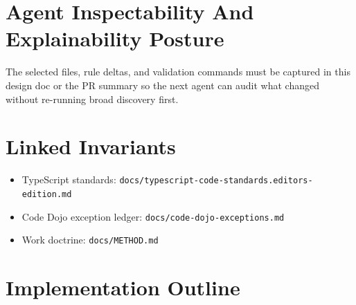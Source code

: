 \section{Agent Inspectability And Explainability Posture}\label{record-233-agent-inspectability-and-explainability-posture}

The selected files, rule deltas, and validation commands must be captured in this design doc or the PR summary so the next agent can audit what changed without re-running broad discovery first.

\section{Linked Invariants}\label{record-233-linked-invariants}

\begin{itemize}
\tightlist
\item
  TypeScript standards: \texttt{d\allowbreak{}o\allowbreak{}c\allowbreak{}s\allowbreak{}/\allowbreak{}t\allowbreak{}y\allowbreak{}p\allowbreak{}e\allowbreak{}s\allowbreak{}c\allowbreak{}r\allowbreak{}i\allowbreak{}p\allowbreak{}t\allowbreak{}-\allowbreak{}c\allowbreak{}o\allowbreak{}d\allowbreak{}e\allowbreak{}-\allowbreak{}s\allowbreak{}t\allowbreak{}a\allowbreak{}n\allowbreak{}d\allowbreak{}a\allowbreak{}r\allowbreak{}d\allowbreak{}s\allowbreak{}.\allowbreak{}e\allowbreak{}d\allowbreak{}i\allowbreak{}t\allowbreak{}o\allowbreak{}r\allowbreak{}s\allowbreak{}-\allowbreak{}e\allowbreak{}d\allowbreak{}i\allowbreak{}t\allowbreak{}i\allowbreak{}o\allowbreak{}n\allowbreak{}.\allowbreak{}m\allowbreak{}d}
\item
  Code Dojo exception ledger: \texttt{d\allowbreak{}o\allowbreak{}c\allowbreak{}s\allowbreak{}/\allowbreak{}c\allowbreak{}o\allowbreak{}d\allowbreak{}e\allowbreak{}-\allowbreak{}d\allowbreak{}o\allowbreak{}j\allowbreak{}o\allowbreak{}-\allowbreak{}e\allowbreak{}x\allowbreak{}c\allowbreak{}e\allowbreak{}p\allowbreak{}t\allowbreak{}i\allowbreak{}o\allowbreak{}n\allowbreak{}s\allowbreak{}.\allowbreak{}m\allowbreak{}d}
\item
  Work doctrine: \texttt{d\allowbreak{}o\allowbreak{}c\allowbreak{}s\allowbreak{}/\allowbreak{}M\allowbreak{}E\allowbreak{}T\allowbreak{}H\allowbreak{}O\allowbreak{}D\allowbreak{}.\allowbreak{}m\allowbreak{}d}
\end{itemize}

\section{Implementation Outline}\label{record-233-implementation-outline}

